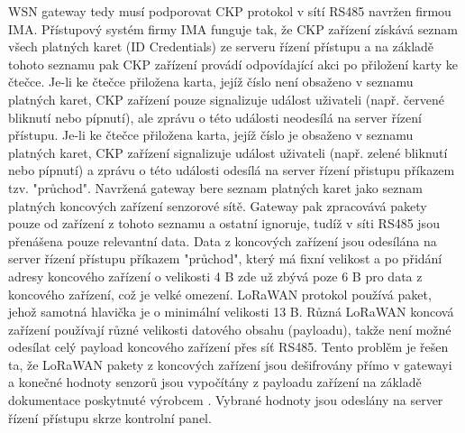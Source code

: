 WSN gateway tedy musí podporovat CKP protokol v sítí RS485 navržen firmou IMA.
Přístupový systém firmy IMA funguje tak, že CKP zařízení získává seznam všech platných karet (ID Credentials) ze serveru řízení přístupu a na základě tohoto seznamu pak CKP zařízení provádí odpovídající akci po přiložení karty ke čtečce. 
Je-li ke čtečce přiložena karta, jejíž číslo není obsaženo v seznamu platných karet, CKP zařízení pouze signalizuje událost uživateli (např. červené bliknutí nebo pípnutí), ale zprávu o této události neodesílá na server řízení přístupu. Je-li ke čtečce přiložena karta, jejíž číslo je obsaženo v seznamu platných karet, CKP zařízení signalizuje událost uživateli (např. zelené bliknutí nebo pípnutí) a zprávu o této události odesílá na server řízení přistupu příkazem tzv. "průchod".
Navržená gateway bere seznam platných karet jako seznam platných koncových zařízení senzorové sítě. Gateway pak zpracovává pakety pouze od zařízení z tohoto seznamu a ostatní ignoruje, tudíž v síti RS485 jsou přenášena pouze relevantní data.
Data z koncových zařízení jsou odesílána na server řízení přístupu příkazem "průchod", který má fixní velikost a po přidání adresy koncového zařízení o velikosti 4 B zde už zbývá poze 6 B pro data z koncového zařízení, což je velké omezení.
LoRaWAN protokol používá paket, jehož samotná hlavička je o minimální velikosti 13 B. 
Různá LoRaWAN koncová zařízení používají různé velikosti datového obsahu (payloadu), takže není možné odesílat celý payload koncového zařízení přes síť RS485.
Tento problěm je řešen ta, že LoRaWAN pakety z koncových zařízení jsou dešifrovány přímo v gatewayi a konečné hodnoty senzorů jsou vypočítány z payloadu zařízení na základě dokumentace poskytnuté výrobcem \cite{RHF1S001 pdf}. Vybrané hodnoty jsou odeslány na server řízení přístupu skrze kontrolní panel. 


